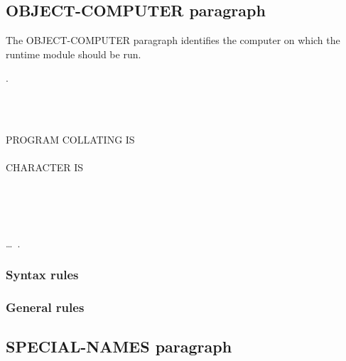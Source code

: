 \subsection{OBJECT-COMPUTER paragraph}

The OBJECT-COMPUTER paragraph identifies the computer on which the runtime module should be run.

\begin{syntax}
  .

  \begin{0-1}
    \begin{0-1}
      \begin{1=}
        \computername
      \end{1=}\gnucobol{\ldots}
    \end{0-1}\\\quad
    \begin{0-1}
       \\
      PROGRAM COLLATING  IS  \\
       \\
      CHARACTER  IS
      \begin{1=}
         \\
         \\
         \\
      \end{1=}
    \end{0-1}\ldots\ {}.
  \end{0-1}
\end{syntax}

\subsubsection{Syntax rules}

\subsubsection{General rules}

\subsection{SPECIAL-NAMES paragraph}



